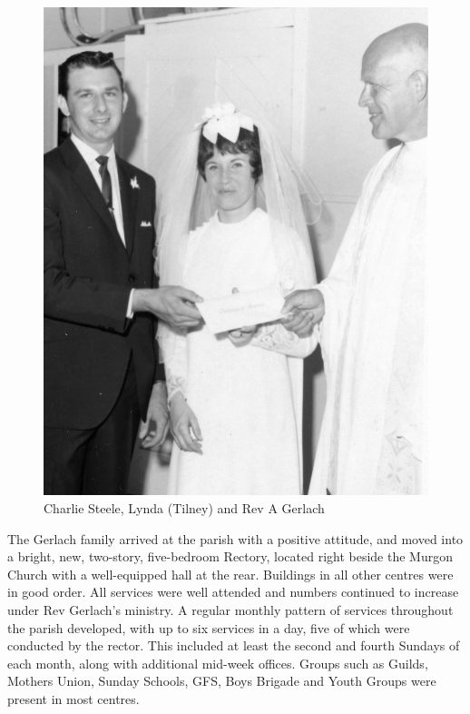 \begin{figure}
\begin{center}
\includegraphics[width=1.\linewidth,center]{../images/lyndaTilneyVestry.jpg}
\caption{Charlie Steele, Lynda (Tilney) and Rev A Gerlach}
\end{center}
\end{figure}




The Gerlach family arrived at the parish with a positive attitude, and moved into a bright, new, two-story, five-bedroom Rectory, located right beside the Murgon Church with a well-equipped hall at the rear. Buildings in all other centres were in good order. All services were well attended and numbers continued to increase under Rev Gerlach's ministry. A regular monthly pattern of services throughout the parish developed, with up to six services in a day, five of which were conducted by the rector. This included at least the second and fourth Sundays of each month, along with additional mid-week offices. Groups such as Guilds, Mothers Union, Sunday Schools, GFS, Boys Brigade and Youth Groups were present in most centres.



